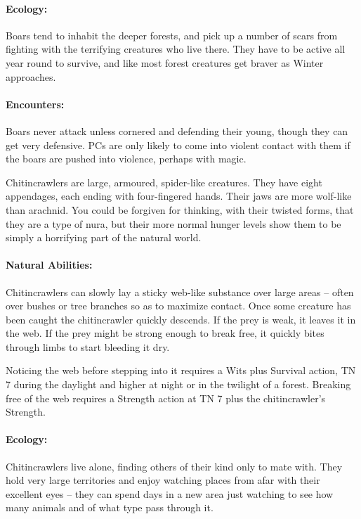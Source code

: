 \begin{multicols}{2}
\label{boar}
\boar

\paragraph{Ecology:} Boars tend to inhabit the deeper forests, and pick up a number of scars from fighting with the terrifying creatures who live there.
They have to be active all year round to survive, and like most forest creatures get braver as Winter approaches.

\paragraph{Encounters:} Boars never attack unless cornered and defending their young, though they can get very defensive.  PCs are only likely to come into violent contact with them if the boars are pushed into violence, perhaps with magic.

\label{chitincrawler}

Chitincrawlers are large, armoured, spider-like creatures.
They have eight appendages, each ending with four-fingered hands.
Their jaws are more wolf-like than arachnid.
You could be forgiven for thinking, with their twisted forms, that they are a type of nura, but their more normal hunger levels show them to be simply a horrifying part of the natural world.

\chitincrawler

\paragraph{Natural Abilities:} Chitincrawlers can slowly lay a sticky web-like substance over large areas -- often over bushes or tree branches so as to maximize contact.
Once some creature has been caught the chitincrawler quickly descends.
If the prey is weak, it leaves it in the web.
If the prey might be strong enough to break free, it quickly bites through limbs to start bleeding it dry.

Noticing the web before stepping into it requires a Wits plus Survival action, TN 7 during the daylight and higher at night or in the twilight of a forest.
Breaking free of the web requires a Strength action at TN 7 plus the chitincrawler's Strength.

\paragraph{Ecology:} Chitincrawlers live alone, finding others of their kind only to mate with.
They hold very large territories and enjoy watching places from afar with their excellent eyes -- they can spend days in a new area just watching to see how many animals and of what type pass through it.


\end{multicols}
